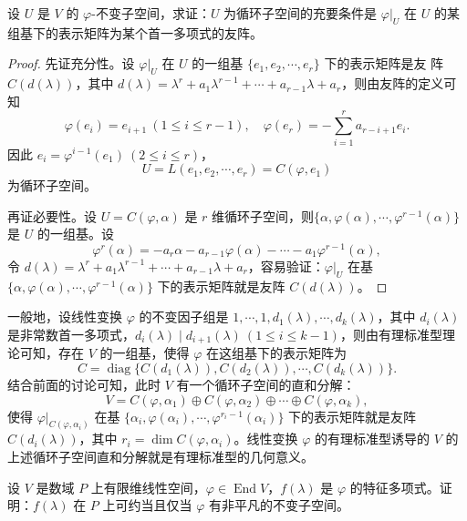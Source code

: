 \documentclass[lang=cn,12pt]{elegantbook}
\begin{document}
\begin{theorem}
        设 \( U \) 是 \( V \) 的 \( \varphi \)-不变子空间，求证：\( U \) 为循环子空间的充要条件是  
\(\varphi|_U\) 在 \( U \) 的某组基下的表示矩阵为某个首一多项式的友阵。
\end{theorem}

\begin{proof}
    先证充分性。设 \(\varphi|_U\) 在 \( U \) 的一组基 \(\{e_1, e_2, \cdots, e_r\}\) 下的表示矩阵是友  
阵 \( C(d(\lambda)) \)，其中 \( d(\lambda) = \lambda^r + a_1\lambda^{r-1} + \cdots + a_{r-1}\lambda + a_r \)，则由友阵的定义可知  
\[
\varphi(e_i) = e_{i+1} \ (1 \leq i \leq r-1), \quad \varphi(e_r) = -\sum_{i=1}^r a_{r-i+1}e_i.
\]
因此 \( e_i = \varphi^{i-1}(e_1) \ (2 \leq i \leq r) \)，  
\[
U = L(e_1, e_2, \cdots, e_r) = C(\varphi, e_1)
\]
为循环子空间。

再证必要性。设 \( U = C(\varphi, \alpha) \) 是 \( r \) 维循环子空间，则\(\{\alpha, \varphi(\alpha), \cdots, \varphi^{r-1}(\alpha)\}\) 是 \( U \) 的一组基。设  
\[
\varphi^r(\alpha) = -a_r\alpha - a_{r-1}\varphi(\alpha) - \cdots - a_1\varphi^{r-1}(\alpha),
\]
令 \( d(\lambda) = \lambda^r + a_1\lambda^{r-1} + \cdots + a_{r-1}\lambda + a_r \)，容易验证：\(\varphi|_U\) 在基 \(\{\alpha, \varphi(\alpha), \cdots, \varphi^{r-1}(\alpha)\}\)  
下的表示矩阵就是友阵 \( C(d(\lambda)) \)。
\end{proof}

一般地，设线性变换 \(\varphi\) 的不变因子组是 \(1, \cdots, 1, d_1(\lambda), \cdots, d_k(\lambda)\)，其中 \(d_i(\lambda)\) 是非常数首一多项式，\(d_i(\lambda) \mid d_{i+1}(\lambda)\ (1 \leq i \leq k-1)\)，则由有理标准型理论可知，存在 \(V\) 的一组基，使得 \(\varphi\) 在这组基下的表示矩阵为
\[
C = \operatorname{diag}\{C(d_1(\lambda)), C(d_2(\lambda)), \cdots, C(d_k(\lambda))\}.
\]
结合前面的讨论可知，此时 \(V\) 有一个循环子空间的直和分解：
\[
V = C(\varphi, \alpha_1) \oplus C(\varphi, \alpha_2) \oplus \cdots \oplus C(\varphi, \alpha_k),
\]
使得 \(\varphi|_{C(\varphi, \alpha_i)}\) 在基 \(\{\alpha_i, \varphi(\alpha_i), \cdots, \varphi^{r_i-1}(\alpha_i)\}\) 下的表示矩阵就是友阵 \(C(d_i(\lambda))\)，其中 \(r_i = \dim C(\varphi, \alpha_i)\)。线性变换 \(\varphi\) 的有理标准型诱导的 \(V\) 的上述循环子空间直和分解就是有理标准型的几何意义。

\begin{example}
    设 \(V\) 是数域 \(P\) 上有限维线性空间，\(\varphi \in \operatorname{End}V\)，\(f(\lambda)\) 是 \(\varphi\) 的特征多项式。证明：\(f(\lambda)\) 在 \(P\) 上可约当且仅当 \(\varphi\) 有非平凡的不变子空间。
\end{example}
\end{document}
